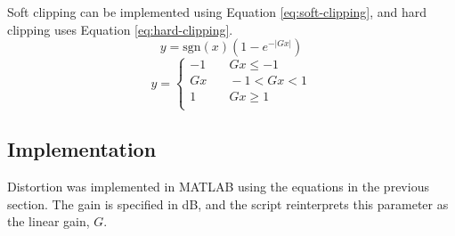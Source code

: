 Soft clipping can be implemented using Equation \ref{eq:soft-clipping}, and hard clipping uses Equation \ref{eq:hard-clipping}.
\begin{equation}
    y = \mathrm{sgn}(x) (1 - e^{-|Gx|})
    \label{eq:soft-clipping}
\end{equation}
\begin{equation}
    y =
    \begin{cases}
        -1 & \quad Gx \leq -1 \\
        Gx & \quad -1 < Gx < 1 \\
        1 & \quad Gx \geq 1 \\
    \end{cases}
    \label{eq:hard-clipping}
\end{equation}

\subsection{Implementation}
Distortion was implemented in MATLAB using the equations in the previous section. The gain is specified in dB, and the script reinterprets this parameter as the linear gain, $G$.

